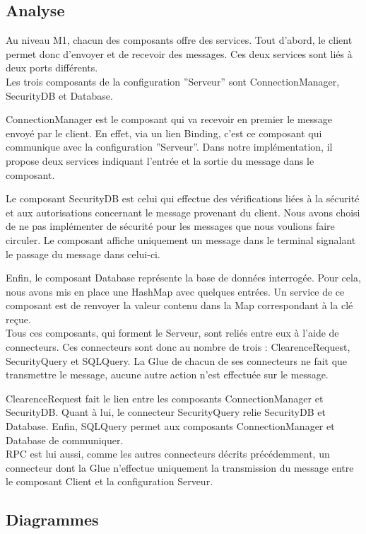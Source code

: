 \documentclass[11pt,a4paper]{article}
\begin{document}
\subsection{Analyse}
Au niveau M1, chacun des composants offre des services. Tout d'abord, le
client permet donc d'envoyer et de recevoir des messages. Ces deux services
sont liés à deux ports différents.\\


Les trois composants de la configuration ''Serveur'' sont ConnectionManager,
SecurityDB et Database.
 
ConnectionManager est le composant qui va recevoir en premier le message envoyé
par le client. En effet, via un lien Binding, c'est ce composant qui communique
avec la configuration ''Serveur''. Dans notre implémentation, il propose deux
services indiquant l'entrée et la sortie du message dans le composant.

Le composant SecurityDB est celui qui effectue des vérifications liées à
la sécurité et aux autorisations concernant le message provenant du client.
Nous avons choisi de ne pas implémenter de sécurité pour les messages que nous
voulions faire circuler. Le composant affiche uniquement un message dans le
terminal signalant le passage du message dans celui-ci. 

Enfin, le composant Database représente la base de données interrogée. Pour
cela, nous avons mis en place une HashMap avec quelques entrées. Un service de
ce composant est de renvoyer la valeur contenu dans la Map correspondant à la
clé reçue.\\

Tous ces composants, qui forment le Serveur, sont reliés entre eux à l'aide de
connecteurs. Ces connecteurs sont donc au nombre de trois : ClearenceRequest,
SecurityQuery et SQLQuery. La Glue de chacun de ses connecteurs ne fait que
transmettre le message, aucune autre action n'est effectuée sur le message.

ClearenceRequest fait le lien entre les composants ConnectionManager et
SecurityDB. Quant à lui, le connecteur SecurityQuery relie SecurityDB et
Database. Enfin, SQLQuery permet aux composants ConnectionManager et Database
de communiquer.\\

RPC est lui aussi, comme les autres connecteurs décrits précédemment, un
connecteur dont la Glue n'effectue uniquement la transmission du message entre
le composant Client et la configuration Serveur.

\clearpage
\subsection{Diagrammes}
\end{document}
